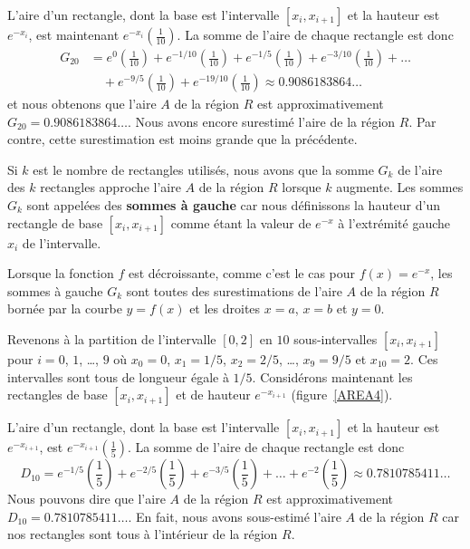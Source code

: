 {

L'aire d'un rectangle, dont la base est l'intervalle $[x_i, x_{i+1}]$
et la hauteur est $e^{-x_i}$, est maintenant
$e^{-x_i} \left(\frac{1}{10}\right)$.
La somme de l'aire de chaque rectangle est donc
\begin{align*}
G_{20} &= e^{0} \left(\frac{1}{10}\right)
+ e^{-1/10} \left(\frac{1}{10}\right)
+ e^{-1/5} \left(\frac{1}{10}\right)
+ e^{-3/10} \left(\frac{1}{10}\right) + \ldots \\
&\quad + e^{-9/5} \left(\frac{1}{10}\right)
+ e^{-19/10} \left(\frac{1}{10}\right) \approx 0.9086183864\ldots
\end{align*}
et nous obtenons que l'aire $A$ de la région $R$ est approximativement
$G_{20} = 0.9086183864\ldots$.  Nous avons encore surestimé l'aire de la
région $R$.  Par contre, cette surestimation est moins grande que la
précédente.

Si $k$ est le nombre de rectangles utilisés, nous avons que la somme $G_k$
de l'aire des $k$ rectangles approche l'aire $A$ de la région $R$
lorsque $k$ augmente.  Les sommes $G_k$ sont appelées des
{\bfseries sommes à gauche} car nous définissons la hauteur d'un rectangle
de base $[x_i, x_{i+1}]$ comme étant la valeur de $e^{-x}$ à l'extrémité
gauche $x_i$ de l'intervalle.

\begin{rmk}
Lorsque la fonction $f$ est décroissante, comme c'est le cas pour
$f(x)=e^{-x}$, les sommes à gauche $G_k$ sont toutes des surestimations
de l'aire $A$ de la région $R$ bornée par la courbe $y=f(x)$ et les
droites $x=a$, $x=b$ et $y=0$.
\end{rmk}

Revenons à la partition de l'intervalle $[0,2]$ en $10$
sous-intervalles $[x_i,x_{i+1}]$ pour $i=0$, $1$, \ldots, $9$ où
$x_0 = 0$, $x_1 = 1/5$, $x_2=2/5$, \ldots , $x_{9} = 9/5$ et
$x_{10} = 2$.  Ces intervalles sont tous de longueur égale à $1/5$.
Considérons maintenant les rectangles de base $[x_i,x_{i+1}]$ et de
hauteur $e^{-x_{i+1}}$ (figure~\ref{AREA4}).


L'aire d'un rectangle, dont la base est l'intervalle $[x_i, x_{i+1}]$
et la hauteur est $e^{-x_{i+1}}$, est
$e^{-x_{i+1}} \left(\frac{1}{5}\right)$.  La somme de l'aire de chaque
rectangle est donc
\[
D_{10} = e^{-1/5} \left(\frac{1}{5}\right)
+ e^{-2/5} \left(\frac{1}{5}\right)
+ e^{-3/5} \left(\frac{1}{5}\right) + \ldots
+ e^{-2} \left(\frac{1}{5}\right) \approx
0.7810785411\ldots
\]
Nous pouvons dire que l'aire $A$ de la région $R$ est approximativement
$D_{10} = 0.7810785411\ldots$.  En fait, nous avons sous-estimé l'aire $A$ de
la région $R$ car nos rectangles sont tous à l'intérieur de la région $R$.
 
}
